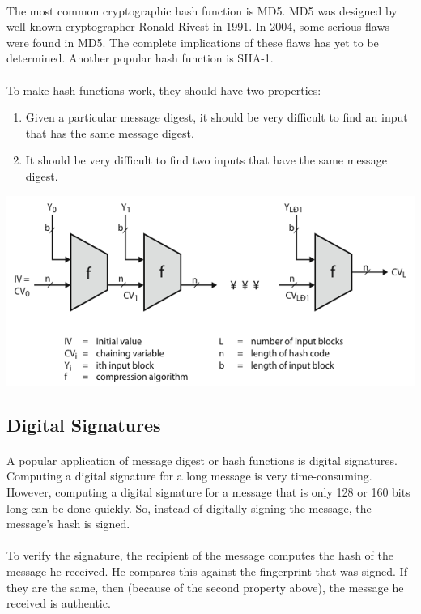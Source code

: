\documentclass[a4paper,12pt]{article}
\begin{document}
		\paragraph{} The most common cryptographic hash function is MD5. MD5 was designed by well-known cryptographer Ronald Rivest in 1991. In 2004, some serious flaws were found in MD5. The complete implications of these flaws has yet to be determined. Another popular hash function is SHA-1. 
		\paragraph{} To make hash functions work, they should have two properties:
		\begin{enumerate}
			\item Given a particular message digest, it should be very difficult to find an input that has the same message digest.
			\item It should be very difficult to find two inputs that have the same message digest.
		\end{enumerate}
		\includegraphics[width=\textwidth]{hash_algo_structure}
		
	\subsection{Digital Signatures}
		\paragraph{} A popular application of message digest or hash functions is digital signatures. Computing a digital signature for a long message is very time-consuming. However, computing a digital signature for a message that is only 128 or 160 bits long can be done quickly. So, instead of digitally signing the message, the message's hash is signed. 
		\paragraph{} To verify the signature, the recipient of the message computes the hash of the message he received. He compares this against the fingerprint that was signed. If they are the same, then (because of the second property above), the message he received is authentic.
\end{document}
